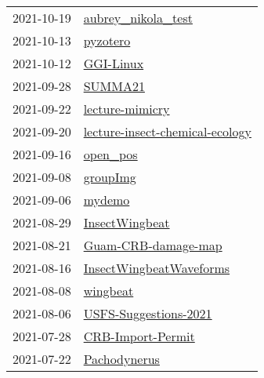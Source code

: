 \begin{longtable}{ll}
2021-10-19 &                                     \href{https://github.com/aubreymoore/aubrey\_nikola\_test}{aubrey\_nikola\_test} \\
2021-10-13 &                                                         \href{https://github.com/aubreymoore/pyzotero}{pyzotero} \\
2021-10-12 &                                                       \href{https://github.com/aubreymoore/GGI-Linux}{GGI-Linux} \\
2021-09-28 &                                                           \href{https://github.com/aubreymoore/SUMMA21}{SUMMA21} \\
2021-09-22 &                                           \href{https://github.com/aubreymoore/lecture-mimicry}{lecture-mimicry} \\
2021-09-20 &           \href{https://github.com/aubreymoore/lecture-insect-chemical-ecology}{lecture-insect-chemical-ecology} \\
2021-09-16 &                                                         \href{https://github.com/aubreymoore/open\_pos}{open\_pos} \\
2021-09-08 &                                                         \href{https://github.com/aubreymoore/groupImg}{groupImg} \\
2021-09-06 &                                                             \href{https://github.com/aubreymoore/mydemo}{mydemo} \\
2021-08-29 &                                             \href{https://github.com/aubreymoore/InsectWingbeat}{InsectWingbeat} \\
2021-08-21 &                                   \href{https://github.com/aubreymoore/Guam-CRB-damage-map}{Guam-CRB-damage-map} \\
2021-08-16 &                           \href{https://github.com/aubreymoore/InsectWingbeatWaveforms}{InsectWingbeatWaveforms} \\
2021-08-08 &                                                         \href{https://github.com/aubreymoore/wingbeat}{wingbeat} \\
2021-08-06 &                               \href{https://github.com/aubreymoore/USFS-Suggestions-2021}{USFS-Suggestions-2021} \\
2021-07-28 &                                       \href{https://github.com/aubreymoore/CRB-Import-Permit}{CRB-Import-Permit} \\
2021-07-22 &                                                 \href{https://github.com/aubreymoore/Pachodynerus}{Pachodynerus} \\

\end{longtable}
